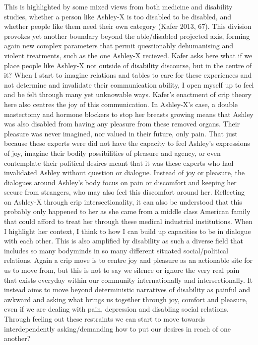 This is highlighted by some mixed views from both medicine and
disability studies, whether a person like Ashley-X is too disabled to be
disabled, and whether people like them need their own category (Kafer
2013, 67). This division provokes yet another boundary beyond the
able/disabled projected axis, forming again new complex parameters that
permit questionably dehumanising and violent treatments, such as the one
Ashley-X recieved. Kafer asks here what if we place people like Ashley-X
not outside of disability discourse, but in the centre of it? When I
start to imagine relations and tables to care for these experiences and
not determine and invalidate their communication ability, I open myself
up to feel and be felt through many yet unknowable ways. Kafer's
enactment of crip theory here also centres the joy of this
communication. In Ashley-X's case, a double mastectomy and hormone
blockers to stop her breasts growing means that Ashley was also disabled
from having any pleasure from these removed organs. Their pleasure was
never imagined, nor valued in their future, only pain. That just because
these experts were did not have the capacity to feel Ashley's
expressions of joy, imagine their bodily possibilities of pleasure and
agency, or even contemplate their political desires meant that it was
these experts who had invalidated Ashley without question or dialogue.
Instead of joy or pleasure, the dialogues around Ashley's body focus on
pain or discomfort and keeping her secure from strangers, who may also
feel this discomfort around her. Reflecting on Ashley-X through crip
intersectionality, it can also be understood that this probably only
happened to her as she came from a middle class American family that
could afford to treat her through these medical industrial institutions.
When I highlight her context, I think to how I can build up capacities
to be in dialogue with each other. This is also amplified by disability
as such a diverse field that includes so many bodyminds in so many
different situated social/political relations. Again a crip move is to
centre joy and pleasure as an actionable site for us to move from, but
this is not to say we silence or ignore the very real pain that exists
everyday within our community internationally and intersectionally. It
instead aims to move beyond deterministic narratives of disability as
painful and awkward and asking what brings us together through joy,
comfort and pleasure, even if we are dealing with pain, depression and
disabling social relations. Through feeling out these restraints we can
start to move towards interdependently asking/demanding how to put our
desires in reach of one another?

